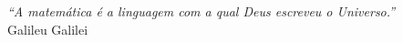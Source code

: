 \begingroup
\thispagestyle{empty}
\vspace*{\fill}
\begin{flushright}
  \textit{``A matemática é a linguagem com a qual Deus escreveu o Universo.''}\\[1em]
  Galileu Galilei
\end{flushright}
\vspace*{\fill}
\endgroup

